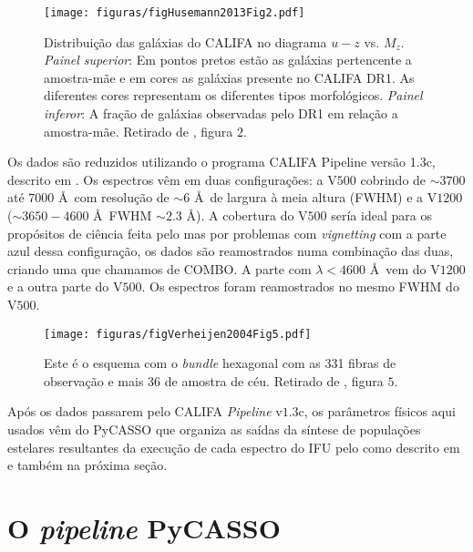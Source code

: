 \begin{figure}
    \texttt{[image: figuras/figHusemann2013Fig2.pdf]}
    \caption[Diagrama cor-magnitude para as galáxias do CALIFA.]
    {Distribui\c{c}\~ao das galáxias do CALIFA no diagrama $u-z$ vs. $M_z$. 
    {\em Painel superior}: Em pontos pretos est\~ao as galáxias pertencente a
    amostra-m\~ae e em cores as galáxias presente no CALIFA DR1. As diferentes
    cores representam os diferentes tipos morfológicos. {\em Painel inferor}: A
    fra\c{c}\~ao de galáxias observadas pelo DR1 em rela\c{c}\~ao a
    amostra-m\~ae. Retirado de \citet{Husemann2013}, figura $2$.}
    \label{fig:cm-uzMz}
\end{figure}

Os dados são reduzidos utilizando o programa CALIFA Pipeline versão 1.3c,
descrito em \citet{Husemann2013}. Os espectros vêm em duas configurações: a
V$500$ cobrindo de $\sim3700$ até $7000$ \AA\ com resolução de $\sim6$ \AA\ 
de largura à meia altura (FWHM) e a V$1200$ ($\sim3650-4600$ \AA\  FWHM
$\sim2.3$ \AA). A cobertura do V$500$ sería ideal para os propósitos de ciência feita pelo
\starlight mas por problemas com {\em vignetting} com a parte azul dessa
configuração, os dados são reamostrados numa combinação das duas, criando uma
que chamamos de COMBO. A parte com $\lambda < 4600$ \AA\  vem do V$1200$ e a
outra parte do V$500$. Os espectros foram reamostrados no mesmo FWHM do V$500$.

\begin{figure}
    \texttt{[image: figuras/figVerheijen2004Fig5.pdf]}
    \caption[Configura\c{c}\~ao do {\em bundle} de fibras do PPMAS/PPAK.]
    {Este é o esquema com o {\em bundle} hexagonal com as 331 fibras de
    observação e mais 36 de amostra de céu. Retirado de \citet{Verheijen2004},
    figura $5$.}
    \label{fig:BundlePPAK}
\end{figure}

Após os dados passarem pelo CALIFA {\em Pipeline} v$1.3$c, os parâmetros físicos
aqui usados vêm do PyCASSO que organiza as saídas da síntese de populações
estelares resultantes da execução de cada espectro do IFU pelo \starlight
\citep{CidFernandes2005} como descrito em \citet{CidFernandes2013a} e também na
próxima seção.


\section{O {\em pipeline} PyCASSO}
\label{sec:CALePyC:PyCASSO}

